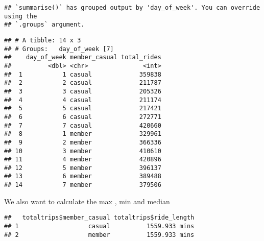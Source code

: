 \documentclass[
]{article}
\newenvironment{Shaded}{\begin{snugshade}}{\end{snugshade}}
\newcommand{\AttributeTok}[1]{\textcolor[rgb]{0.13,0.29,0.53}{#1}}
\newcommand{\CommentTok}[1]{\textcolor[rgb]{0.56,0.35,0.01}{\textit{#1}}}
\newcommand{\FunctionTok}[1]{\textcolor[rgb]{0.13,0.29,0.53}{\textbf{#1}}}
\newcommand{\NormalTok}[1]{#1}
\newcommand{\SpecialCharTok}[1]{\textcolor[rgb]{0.81,0.36,0.00}{\textbf{#1}}}
\begin{document}
\begin{verbatim}
## `summarise()` has grouped output by 'day_of_week'. You can override using the
## `.groups` argument.
\end{verbatim}

\begin{verbatim}
## # A tibble: 14 x 3
## # Groups:   day_of_week [7]
##    day_of_week member_casual total_rides
##          <dbl> <chr>               <int>
##  1           1 casual             359838
##  2           2 casual             211787
##  3           3 casual             205326
##  4           4 casual             211174
##  5           5 casual             217421
##  6           6 casual             272771
##  7           7 casual             420660
##  8           1 member             329961
##  9           2 member             366336
## 10           3 member             410610
## 11           4 member             420896
## 12           5 member             396137
## 13           6 member             389488
## 14           7 member             379506
\end{verbatim}

We also want to calculate the max , min and median

\begin{Shaded}
\end{Shaded}

\begin{verbatim}
##   totaltrips$member_casual totaltrips$ride_length
## 1                   casual          1559.933 mins
## 2                   member          1559.933 mins
\end{verbatim}

\begin{Shaded}
\end{Shaded}
\end{document}
